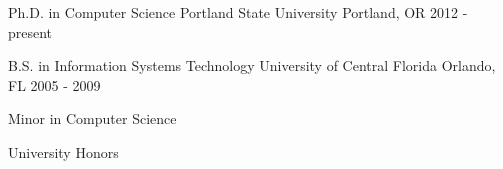 

\begin{cventries}

  \cventry
    {Ph.D. in Computer Science} %
    {Portland State University} %
    {Portland, OR} %
    {2012 - present} %
    {}


  \cventry
    {B.S. in Information Systems Technology} %
    {University of Central Florida} %
    {Orlando, FL} %
    {2005 - 2009} %
    {
      \begin{cvitems} %
        \item {Minor in Computer Science}
        \item {University Honors}
      \end{cvitems}
    }

\end{cventries}
